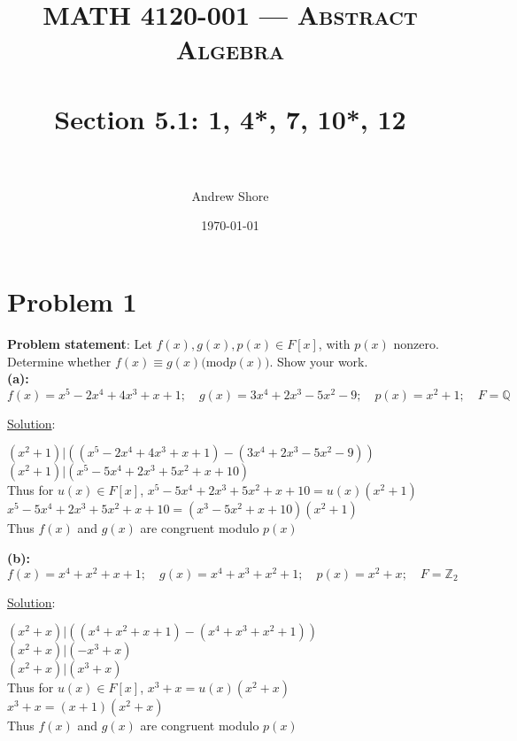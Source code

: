 \documentclass{article} %
\title{ 
\normalfont \normalsize 
\textsc{MATH 4120-001 --- Abstract Algebra} \\
\horrule{0.5pt} \\[0cm] %
\huge Section  5.1: 1, 4*, 7, 10*, 12\\ %
\horrule{2pt} \\[0cm] %
}
\author{Andrew Shore} %
\date{\normalsize\today} %
\begin{document}
\maketitle %

\section*{Problem 1}


\textbf{Problem statement}: Let $f(x), g(x), p(x) \in F[x]$, with $p(x)$ nonzero.  Determine whether $f(x) \equiv g(x) ($mod$ p(x))$.  Show your work.
\\

\textbf{(a): } $f(x) = x^5 - 2x^4 + 4x^3 + x + 1; \quad  g(x) = 3x^4 + 2x^3 - 5x^2 - 9; \quad p(x) = x^2 + 1; \quad F = \mathbb{Q}$
\begin{addmargin}[1em]{0em}
\underline{Solution}: 
\begin{addmargin}[1em]{0em}
$(x^2 + 1) | ((x^5 - 2x^4 + 4x^3 + x + 1) - (3x^4 + 2x^3 - 5x^2 - 9))$
\\$(x^2 + 1) | (x^5 - 5x^4 + 2x^3 + 5x^2 + x + 10)$
\\Thus for $u(x) \in F[x]$, $x^5 - 5x^4 + 2x^3 + 5x^2 + x + 10 = u(x)(x^2 + 1)$
\\ $x^5 - 5x^4 + 2x^3 + 5x^2 + x + 10 =(x^3 - 5x^2 + x + 10)(x^2 + 1)$
\\Thus $f(x)$ and $g(x)$ are congruent modulo $p(x)$
\end{addmargin}
\end{addmargin}    

\textbf{(b): } $f(x) = x^4 + x^2 + x + 1; \quad  g(x) = x^4 + x^3 + x^2 + 1; \quad p(x) = x^2 + x; \quad F = \mathbb{Z}_2$
\begin{addmargin}[1em]{0em}
\underline{Solution}: 
\begin{addmargin}[1em]{0em}
$(x^2 + x)|((x^4 + x^2 + x + 1) - (x^4 + x^3 + x^2 + 1))$
\\$(x^2 + x)|(-x^3 + x)$
\\$(x^2 + x)|(x^3 + x)$
\\Thus for $u(x) \in F[x]$, $x^3 + x = u(x)(x^2 + x)$
\\$x^3 + x = (x + 1)(x^2 + x)$
\\Thus $f(x)$ and $g(x)$ are congruent modulo $p(x)$
\end{addmargin}
\end{addmargin}    
\end{document}
